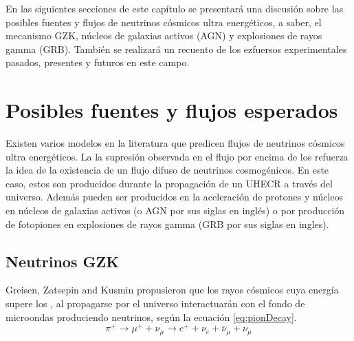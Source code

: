 En las siguientes secciones de este cap\'itulo se presentar\'a una discusi\'on sobre las posibles fuentes y flujos de neutrinos c\'osmicos ultra energ\'eticos, a saber, el mecanismo GZK, n\'ucleos de galaxias activos (AGN) y explosiones de rayos gamma (GRB).
Tambi\'en se realizar\'a un recuento de los ezfuersos experimentales pasados, presentes y futuros en este campo.

\section{Posibles fuentes y flujos esperados}

Existen varios modelos en la literatura que predicen flujos de neutrinos c\'osmicos ultra energ\'eticos.
La la supresi\'on observada en el flujo por encima de los  refuerza la idea de la existencia de un flujo difuso de neutrinos cosmog\'enicos.
En este caso, estos son producidos durante la propagaci\'on de un UHECR a trav\'es del universo. 
Adem\'as pueden ser producidos en la aceleraci\'on de protones y n\'ucleos en n\'ucleos de galaxias activos (o AGN por sus siglas en ingl\'es)\cite{cite:nuAGN} o por producci\'on de fotopiones en explosiones de rayos gamma (GRB por sus siglas en ingles)\cite{cite:nuGRB}.


	\subsection{Neutrinos GZK}
	\label{sbsc:introGZK}
	Greisen, Zatsepin and Kusmin propusieron que los rayos c\'osmicos cuya energ\'ia supere los , al propagarse por el universo interactuar\'an con el fondo de microondas produciendo neutrinos, seg\'un la ecuaci\'on \ref{eq:pionDecay}.
	\begin{equation}\label{eq:pionDecay}
	\pi^{+} \rightarrow \mu^{+}+ \nu_{\mu} \rightarrow e^{+} + \nu_{e} + \bar{\nu}_{\mu} + \nu_{\mu}
	\end{equation}
	
